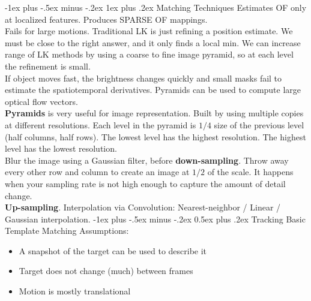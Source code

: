 \documentclass[10pt,landscape]{article}
\makeatletter
\renewcommand{\section}{\@startsection{section}{1}{0mm}%
                                {-1ex plus -.5ex minus -.2ex}%
                                {0.5ex plus .2ex}%
                                {\normalfont\large\bfseries}}
\renewcommand{\subsubsection}{\@startsection{subsubsection}{3}{0mm}%
                                {-1ex plus -.5ex minus -.2ex}%
                                {1ex plus .2ex}%
                                {\normalfont\small\bfseries}}
\makeatother
\begin{document}
\begin{multicols}{3}
\subsubsection{Matching Techniques}
Estimates OF only at localized features. Produces SPARSE OF mappings.\\
Fails for large motions. Traditional LK is just refining a position estimate. We must be close to the right answer, and it only finds a local min. We can increase range of LK methods by using a coarse to fine image pyramid, so at each level the refinement is small. \\
If object moves fast, the brightness changes quickly and small masks fail to estimate the spatiotemporal derivatives. Pyramids can be used to compute large optical flow vectors.\\
\textbf{Pyramids} is very useful for image representation. Built by using multiple copies at different resolutions. Each level in the pyramid is $1/4$ size of the previous level (half columns, half rows). The lowest level has the highest resolution. The highest level has the lowest resolution.\\
Blur the image using a Gaussian filter, before \textbf{down-sampling}. Throw away every other row and column to create an image at $1/2$ of the scale. It happens when your sampling rate is not high enough to capture the amount of detail change.\\
\textbf{Up-sampling}. Interpolation via Convolution: Nearest-neighbor / Linear / Gaussian interpolation.
\section{Tracking}
Basic Template Matching Assumptions:
\begin{itemize}
    \item A snapshot of the target can be used to describe it
    \item Target does not change (much) between frames
    \item Motion is mostly translational
\end{itemize}





\end{multicols}
\end{document}
